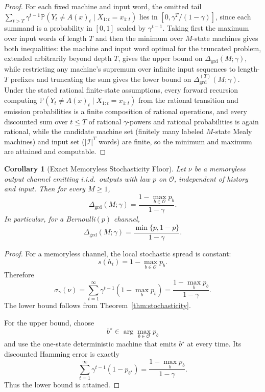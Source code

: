\documentclass[12pt]{article}
\newtheorem{corollary}[theorem]{Corollary}
\theoremstyle{definition}
\begin{document}
\begin{proof}
For each fixed machine and input word, the omitted tail
$\sum_{t>T}\gamma^{t-1}\mathbb P(Y_t\ne A(x)_t\mid X_{1:t}=x_{1:t})$ lies in
$[0,\gamma^T/(1-\gamma)]$, since each summand is a probability in $[0,1]$
scaled by $\gamma^{t-1}$.  Taking first the maximum over input words of
length $T$ and then the minimum over $M$-state machines gives both
inequalities: the machine and input word optimal for the truncated problem,
extended arbitrarily beyond depth $T$, gives the upper bound on
$\Delta_{\mathrm{grd}}(M;\gamma)$, while restricting any machine's supremum
over infinite input sequences to length-$T$ prefixes and truncating the sum
gives the lower bound on $\Delta^{(T)}_{\mathrm{grd}}(M;\gamma)$.  Under the
stated rational finite-state assumptions, every forward recursion computing
$\mathbb P(Y_t\ne A(x)_t\mid X_{1:t}=x_{1:t})$ from the rational transition
and emission probabilities is a finite composition of rational operations,
and every discounted sum over $t\le T$ of rational $\gamma$-powers and
rational probabilities is again rational, while the candidate machine set
(finitely many labeled $M$-state Mealy machines) and input set
($|\mathcal I|^T$ words) are finite, so the minimum and maximum are attained
and computable.
\end{proof}

\begin{corollary}[Exact Memoryless Stochasticity Floor]
\label{cor:memoryless-floor}
Let $\nu$ be a memoryless output channel emitting i.i.d.\ outputs with law
$p$ on $\mathcal O$, independent of history and input.  Then for every
$M\ge1$,
\[
\Delta_{\mathrm{grd}}(M;\gamma)
=
\frac{1-\max_{b\in\mathcal O}p_b}{1-\gamma}.
\]
In particular, for a Bernoulli$(p)$ channel,
\[
\Delta_{\mathrm{grd}}(M;\gamma)
=
\frac{\min\{p,1-p\}}{1-\gamma}.
\]
\end{corollary}

\begin{proof}
For a memoryless channel, the local stochastic spread is constant:
\[
s(h_t)=1-\max_{b\in\mathcal O}p_b.
\]
Therefore
\[
\sigma_\gamma(\nu)
=
\sum_{t=1}^\infty
\gamma^{t-1}
\left(1-\max_{b}p_b\right)
=
\frac{1-\max_b p_b}{1-\gamma}.
\]
The lower bound follows from Theorem~\ref{thm:stochasticity}.

For the upper bound, choose
\[
b^\star\in\arg\max_{b\in\mathcal O}p_b
\]
and use the one-state deterministic machine that emits $b^\star$ at every
time.  Its discounted Hamming error is exactly
\[
\sum_{t=1}^\infty
\gamma^{t-1}
(1-p_{b^\star})
=
\frac{1-\max_b p_b}{1-\gamma}.
\]
Thus the lower bound is attained.
\end{proof}
\end{document}
